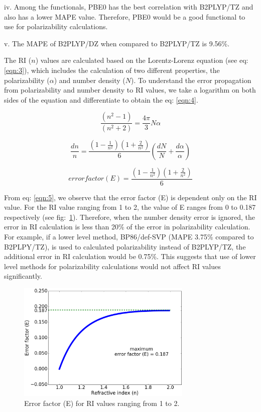 iv.	Among the functionals, PBE0 has the best correlation with B2PLYP/TZ and also has a lower MAPE value. Therefore, PBE0 would be a good functional to use for polarizability calculations.

v. The MAPE of B2PLYP/DZ when compared to B2PLYP/TZ is 9.56\%.


The RI ($n$) values are calculated based on the Lorentz-Lorenz equation (see eq: \ref{eqn:3}), which includes the calculation of two different properties, the polarizability ($\alpha$) and number density ($N$). To understand the error propagation from polarizability and number density to RI values, we take a logarithm on both sides of the equation and differentiate to obtain the eq: \ref{eqn:4}.  

\begin{equation} \label{eqn:3}
\frac{(n^{2}-1)}{(n^2+2)}=\frac{4\pi}{3}N\alpha
\end{equation}

\begin{equation} \label{eqn:4}
\frac{dn}{n}=\frac{(1-\frac{1}{n^2} )(1+\frac{2}{n^2})}{6}(\frac{dN}{N}+\frac{d\alpha}{\alpha})
\end{equation}

\begin{equation} \label{eqn:5}
error factor (E)=\frac{(1-\frac{1}{n^2} )(1+\frac{2}{n^2})}{6}
\end{equation}

From eq: \ref{eqn:5}, we observe that the error factor (E) is dependent only on the RI value. For the RI value ranging from 1 to 2, the value of E ranges from 0 to 0.187 respectively (see fig:\ \ref{fig:Error_factor}). Therefore, when the number density error is ignored, the error in RI calculation is less than 20\% of the error in polarizability calculation. For example, if a lower level method, BP86/def-SVP (MAPE 3.75\% compared to B2PLPY/TZ), is used to calculated polarizability instead of B2PLYP/TZ, the additional error in RI calculation would be 0.75\%. This suggests that use of lower level methods for polarizability calculations would not affect RI values significantly.

\begin{figure}[htbp]  
	\centering
	\includegraphics[width=0.744\textwidth]{Chapter-3/Figures/Error_factor.eps}
	\caption{Error factor (E) for RI values ranging from 1 to 2.} 
	\label{fig:Error_factor} 
\end{figure}  

